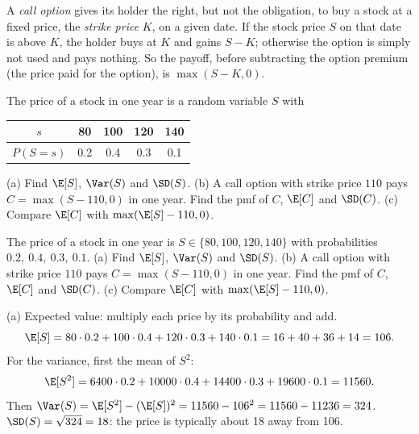 
\begin{problem}
	\begin{context}
		A \emph{call option} gives its holder the right, but not the obligation,
		to buy a stock at a fixed price, the \emph{strike price} $K$, on a given
		date. If the stock price $S$ on that date is above $K$, the holder buys at
		$K$ and gains $S-K$; otherwise the option is simply not used and pays nothing. So the
		payoff, before subtracting the option premium (the price paid for the
		option), is $\max(S-K,0)$.
	\end{context}
	The price of a stock in one year is a random variable $S$ with
	\begin{center}
		\begin{tabular}{c|cccc}
			$s$      & 80  & 100 & 120 & 140 \\\hline
			$P(S=s)$ & 0.2 & 0.4 & 0.3 & 0.1
		\end{tabular}
	\end{center}
	(a) Find $\E[S]$, $\Var(S)$ and $\SD(S)$.
	(b) A call option with strike price $110$ pays $C=\max(S-110,0)$ in one
	year. Find the pmf of $C$, $\E[C]$ and $\SD(C)$.
	(c) Compare $\E[C]$ with $\max(\E[S]-110,0)$.
\end{problem}

\begin{slideproblem}
	The price of a stock in one year is $S\in\{80,100,120,140\}$ with
	probabilities $0.2,\ 0.4,\ 0.3,\ 0.1$.
	(a) Find $\E[S]$, $\Var(S)$ and $\SD(S)$.
	(b) A call option with strike price $110$ pays $C=\max(S-110,0)$ in one
	year. Find the pmf of $C$, $\E[C]$ and $\SD(C)$.
	(c) Compare $\E[C]$ with $\max(\E[S]-110,0)$.
\end{slideproblem}

\begin{slides}
	\small
	\exstatement
	\pause
	\sol (a) Expected value: multiply each price by its probability and add.
	\[ \E[S]=80\cdot0.2+100\cdot0.4+120\cdot0.3+140\cdot0.1
		=16+40+36+14=106. \]
	\pause
	For the variance, first the mean of $S^2$:
	\[ \E[S^2]=6400\cdot0.2+10000\cdot0.4+14400\cdot0.3+19600\cdot0.1
		=11560. \]
	\pause
	Then $\Var(S)=\E[S^2]-(\E[S])^2=11560-106^2=11560-11236=324$.\\[1mm]
	\pause
	$\SD(S)=\sqrt{324}=18$: the price is typically about 18 away from 106.
\end{slides}

